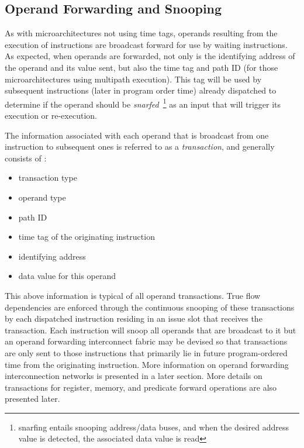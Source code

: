 \documentclass[10pt,twocolumn]{article}
\begin{document}
\subsection{Operand Forwarding and Snooping}
\vspace{-0.15in}
%
As with microarchitectures not using time tags,
operands resulting from the execution of instructions
are broadcast forward for use by waiting instructions.
As expected, when operands are forwarded, not only is the 
identifying address of the operand
and its value sent, but also the time tag and path ID 
(for
those microarchitectures using multipath execution).
This tag will be used by subsequent 
instructions 
(later in program order time)
already dispatched
to determine if
the operand should be {\em snarfed}~\footnote{snarfing entails snooping
address/data buses, and when the desired address value is detected, 
the associated data value is read} 
as an input that will trigger
its execution or re-execution.

The information associated with each operand that is
broadcast from one instruction to subsequent ones
is referred
to as a {\em transaction}, and generally consists of :
%
\begin{itemize}
\vspace{-0.15in}
\item{transaction type}
\vspace{-0.15in}
\item{operand type}
\vspace{-0.15in}
\item{path ID}
\vspace{-0.15in}
\item{time tag of the originating instruction}
\vspace{-0.15in}
\item{identifying address}
\vspace{-0.15in}
\item{data value for this operand}
\vspace{-0.15in}
\end{itemize}   
%
This above information is typical of all operand transactions.
True flow dependencies are enforced through the continuous snooping of
these transactions by each dispatched instruction residing in an issue
slot that receives the transaction.
Each instruction
will snoop all operands that are broadcast to it but
an operand forwarding interconnect fabric may be devised so that
transactions are only sent to those instructions that primarily
lie in future program-ordered time from the originating instruction.  
More information on operand forwarding interconnection networks
is presented in a later section.
More details on transactions for register, memory, and
predicate forward operations are also presented later.
\end{document}
